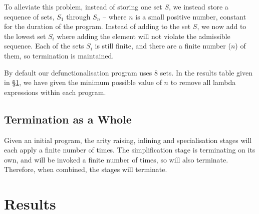\documentclass[preprint]{sigplanconf}
\begin{document}
To alleviate this problem, instead of storing one set $S$, we instead store a sequence of sets, $S_1$ through $S_n$ -- where $n$ is a small positive number, constant for the duration of the program. Instead of adding to the set $S$, we now add to the lowest set $S_i$ where adding the element will not violate the admissible sequence. Each of the sets $S_i$ is still finite, and there are a finite number ($n$) of them, so termination is maintained.

By default our defunctionalisation program uses 8 sets. In the results table given in \S\ref{sec:results}, we have given the minimum possible value of $n$ to remove all lambda expressions within each program.

\subsection{Termination as a Whole}

Given an initial program, the arity raising, inlining and specialisation stages will each apply a finite number of times. The simplification stage is terminating on its own, and will be invoked a finite number of times, so will also terminate. Therefore, when combined, the stages will terminate.

\section{Results}
\label{sec:results}
\end{document}
